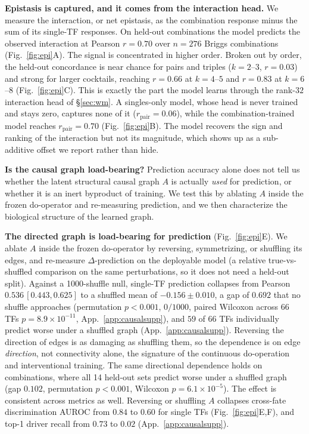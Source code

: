 \documentclass{article}
\begin{document}
\textbf{Epistasis is captured, and it comes from the interaction head.} We measure the interaction, or
net epistasis, as the combination response minus the sum of its single-TF responses. On held-out
combinations the model predicts the observed interaction at Pearson $r{=}0.70$ over $n{=}276$ Briggs
combinations (Fig.~\ref{fig:epi}A). The signal is concentrated in higher order. Broken out by order, the
held-out concordance is near chance for pairs and triples ($k{=}2$--$3$, $r{=}0.03$) and strong for
larger cocktails, reaching $r{=}0.66$ at $k{=}4$--$5$ and $r{=}0.83$ at $k{=}6$--$8$
(Fig.~\ref{fig:epi}C). This is exactly the part the model learns through the rank-$32$ interaction head
of \S\ref{sec:wm}. A singles-only model, whose head is never trained and stays zero, captures none of it
($r_{\mathrm{pair}}{=}0.06$), while the combination-trained model reaches $r_{\mathrm{pair}}{=}0.70$
(Fig.~\ref{fig:epi}B). The model recovers the sign and ranking of the interaction but not its magnitude,
which shows up as a sub-additive offset we report rather than hide.

\textbf{Is the causal graph load-bearing?}\label{sec:causal} Prediction accuracy alone does not tell us whether the
latent structural causal graph $A$ is actually \emph{used} for prediction, or whether it is an inert byproduct of
training. We test this by ablating $A$ inside the frozen do-operator and re-measuring prediction, and we then
characterize the biological structure of the learned graph.

\textbf{The directed graph is load-bearing for prediction} (Fig.~\ref{fig:epi}E). We ablate $A$ inside the
frozen do-operator by reversing, symmetrizing, or shuffling its edges, and re-measure
$\Delta$-prediction on the deployable model (a relative true-vs-shuffled comparison on the same
perturbations, so it does not need a held-out split). Against a 1000-shuffle null, single-TF prediction collapses from
Pearson $0.536\,[0.443,0.625]$ to a shuffled mean of $-0.156\pm0.010$, a gap of $0.692$ that no shuffle approaches (permutation $p<0.001$, $0/1000$, paired Wilcoxon across $66$ TFs
$p{=}8.9\times10^{-11}$, App.~\ref{app:causalsupp}), and $59$ of $66$ TFs individually
predict worse under a shuffled graph (App.~\ref{app:causalsupp}). Reversing the direction of edges is as damaging as shuffling
them, so the dependence is on edge \textit{direction}, not connectivity alone, the signature of the continuous do-operation and interventional training.  The same directional dependence holds on combinations, where all 14 held-out sets predict worse under a shuffled graph (gap $0.102$, permutation $p<0.001$,
Wilcoxon $p{=}6.1\times10^{-5}$). The effect is consistent across metrics as well. Reversing or shuffling $A$ collapses cross-fate discrimination
AUROC from $0.84$ to $0.60$ for single TFs (Fig.~\ref{fig:epi}E,F), and top-1 driver recall from $0.73$ to
$0.02$ (App.~\ref{app:causalsupp}).
\end{document}
